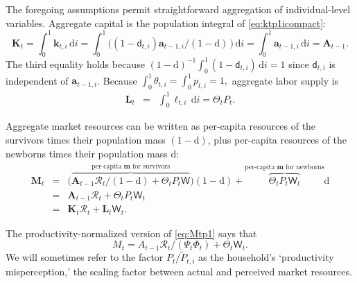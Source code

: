 \documentclass[titlepage]{./econtex}
\begin{document}
The foregoing assumptions permit straightforward aggregation of individual-level variables.  Aggregate capital is the population integral of \eqref{eq:ktp1icompact}:
\begin{equation}
\mathbf{K}_{t} = \int_{0}^{1} \mathbf{k}_{t,i}\,\text{d}i = \int_{0}^{1} \big((1 - \mathsf{d}_{t,i})\mathbf{a}_{t-1,i} \big/(1-\mathrm{d})\, \big)\,\text{d}i = \int_{0}^{1} \mathbf{a}_{t-1,i}\,\text{d}i = \mathbf{A}_{t-1}.   \label{eq:Ktp1}
\end{equation}
 The third equality holds because $(1-\mathrm{d})^{-1}\int_{0}^{1}(1-\mathsf{d}_{t,i})\,\text{d}i = 1$
since $\mathsf{d}_{t,i}$ is independent of $\mathbf{a}_{t-1,i}$.
Because $\int_{0}^{1} \theta_{t,i} = \int_{0}^{1} {p}_{t,i} = 1,$ aggregate labor supply
is
\begin{eqnarray}
  \label{eq:Lt}
  \mathbf{L}_{t} & = & \int_{0}^{1} \pmb{\ell}_{t,i}\,\text{d}i = \Theta_{t} {P}_{t}.
\end{eqnarray}

Aggregate market resources can be written as per-capita resources of the survivors times their population mass $(1-\mathrm{d})$, plus per-capita resources of the newborns times their population mass $\mathrm{d}$:
\begin{eqnarray}
  \mathbf{M}_{t} & = & \big(\overbrace{\mathbf{A}_{t-1} {\mathscr{R}}_t/(1-\mathrm{d})  + \Theta_{t} {P}_{t}\mathsf{W}}^{\text{per-capita $\mathbf{m}$ for survivors}}\big)(1-\mathrm{d})+\overbrace{\Theta_{t} {P}_{t}\mathsf{W}_t}^{\text{per-capita $\mathbf{m}$ for newborns}} \mathrm{d} \nonumber \\
                       & = & \mathbf{A}_{t-1} {\mathscr{R}}_t + \Theta_{t} P_t \mathsf{W}_t  \label{eq:Mtp1} \\
                       & = & \mathbf{K}_t \mathscr{R}_t + \mathbf{L}_t \mathsf{W}_t. \nonumber
\end{eqnarray}
 

The productivity-normalized version of \eqref{eq:Mtp1} says that
\begin{equation}\label{eq:Mtp1norm}
M_t = A_{t-1} \mathscr{R}_t\big/(\Psi_t \Phi_t) + \Theta_t \mathsf{W}_t.
\end{equation}
We will sometimes refer to the factor $P_t\big/\widetilde{P}_{t,i}$ as the household's `productivity misperception,' the scaling factor between actual and perceived market resources.
\end{document}
